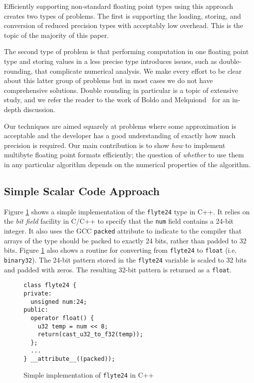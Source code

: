 \documentclass{sig-alternate-05-2015}
\newcommand{\mt}[1]{\texttt{#1}}
\begin{document}
Efficiently supporting non-standard floating point types using this approach
creates two types of problems. The first is supporting the loading, storing,
and conversion of reduced precision types with acceptably low overhead. This is
the topic of the majority of this paper.

The second type of problem is that performing computation in one floating point
type and storing values in a less precise type introduces issues, such as
double-rounding, that complicate numerical analysis. We make every effort to be
clear about this latter group of problems but in most cases we do not have
comprehensive solutions. Double rounding in particular is a topic of extensive
study, and we refer the reader to the work of Boldo and
Melquiond~\cite{boldo2004double} for an in-depth discussion.

Our techniques are aimed squarely at problems where some approximation is
acceptable and the developer has a good understanding of exactly how much
precision is required. Our main contribution is to show \textit{how} to
implement multibyte floating point formats efficiently; the question of
\textit{whether} to use them in any particular algorithm depends on the
numerical properties of the algorithm.

\subsection{Simple Scalar Code Approach}
\label{sec:scalar-approach}

Figure \ref{fig:simple-flyte} shows a simple implementation of the \mt{flyte24}
type in C++. It relies on the \emph{bit field} facility in C/C++ to specify
that the \mt{num} field contains a 24-bit integer. It also uses the GCC
\texttt{packed} attribute to indicate to the compiler that arrays of the type
should be packed to exactly 24 bits, rather than padded to 32 bits. Figure
\ref{fig:simple-flyte} also shows a routine for converting from \mt{flyte24} to
\mt{float} (i.e. \mt{binary32}). The 24-bit pattern stored in the \mt{flyte24}
variable is scaled to 32 bits and padded with zeros. The resulting 32-bit
pattern is returned as a \mt{float}.

\begin{figure}[ht]
\begin{verbatim}
class flyte24 {
private:
  unsigned num:24;
public:
  operator float() {
    u32 temp = num << 8;
    return(cast_u32_to_f32(temp));
  };
  ...
} __attribute__((packed));
\end{verbatim}
\vspace{-9pt}
\caption{Simple implementation of \mt{flyte24} in C++}
\label{fig:simple-flyte}
\end{figure}
\end{document}
